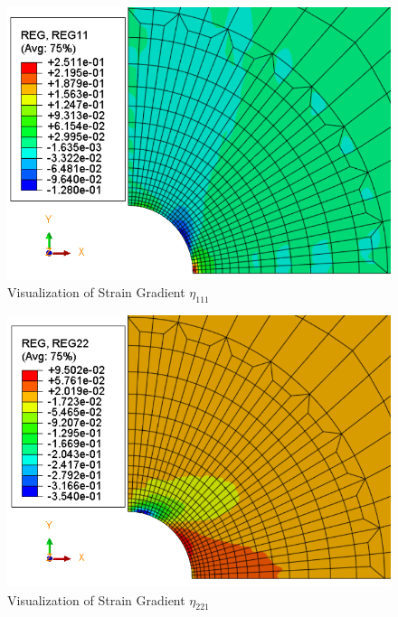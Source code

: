 \documentclass[12pt]{article}
\begin{document}
\begin{figure}[H]
	\begin{center}
		\includegraphics[scale=0.8]{Reg11_crop.png} 
	\end{center}  
   \caption{Visualization of Strain Gradient $\eta_{111} $}
\end{figure}
\begin{figure}[H]
	\begin{center}
		\includegraphics[scale=0.8]{Reg22_crop.png} 
	\end{center}  
   \caption{Visualization of Strain Gradient $\eta_{221} $}
\end{figure}
\end{document}
